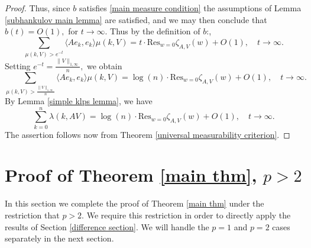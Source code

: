 \begin{proof}
        Thus, since $b$ satisfies \eqref{main measure condition} the assumptions of Lemma \ref{subhankulov main lemma} are satisfied, and we may then conclude that $b(t)=O(1),$ for $t\to\infty$. Thus
        by the definition of $b$:,
        $$\sum_{\mu(k,V)>e^{-t}}\langle Ae_k,e_k\rangle\mu(k,V)=t\cdot\mathrm{Res}_{w=0}\zeta_{A,V}(w)+O(1),\quad t \to\infty.$$
        Setting $e^{-t}=\frac{\|V\|_{1,\infty}}{n},$ we obtain
        $$\sum_{\mu(k,V)>\frac{\|V\|_{1,\infty}}{n}}\langle Ae_k,e_k\rangle\mu(k,V)=\log(n)\cdot \mathrm{Res}_{w=0}\zeta_{A,V}(w)+O(1),\quad t\to\infty.$$
        By Lemma \ref{simple klps lemma}, we have
        $$\sum_{k=0}^n\lambda(k,AV)=\log(n)\cdot \mathrm{Res}_{w=0}\zeta_{A,V}(w)+O(1),\quad t\to\infty.$$
        The assertion follows now from Theorem \ref{universal measurability criterion}.
    \end{proof}

\section[Proof of the main result, $p>2$]{Proof of Theorem \ref{main thm}, $p>2$}\label{main thm p>2}

    In this section we complete the proof of Theorem \ref{main thm} under the restriction that $p > 2$. We require this restriction
    in order to directly apply the results of Section \ref{difference section}. We will handle the $p = 1$ and $p=2$ cases separately in the next section.

